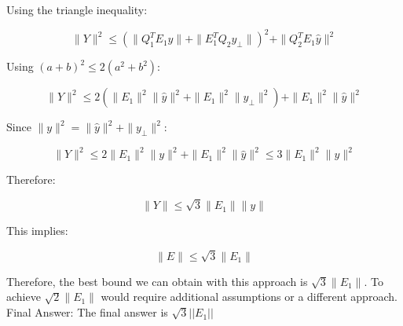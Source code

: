 Using the triangle inequality:

$$
\|Y\|^2 \le (\|Q_1^T E_1 \hat{y}\| + \|E_1^T Q_2 y_\perp\|)^2 + \|Q_2^T E_1 \hat{y}\|^2
$$

Using $(a+b)^2 \le 2(a^2 + b^2)$:

$$
\|Y\|^2 \le 2(\|E_1\|^2 \|\hat{y}\|^2 + \|E_1\|^2 \|y_\perp\|^2) + \|E_1\|^2 \|\hat{y}\|^2
$$

Since $\|y\|^2 = \|\hat{y}\|^2 + \|y_\perp\|^2$:

$$
\|Y\|^2 \le 2\|E_1\|^2 \|y\|^2 + \|E_1\|^2 \|\hat{y}\|^2 \le 3\|E_1\|^2 \|y\|^2
$$

Therefore:

$$
\|Y\| \le \sqrt{3} \|E_1\| \|y\|
$$

This implies:

$$
\|E\| \le \sqrt{3} \|E_1\|
$$

Therefore, the best bound we can obtain with this approach is $\sqrt{3}\|E_1\|$.  To achieve $\sqrt{2}\|E_1\|$ would require additional assumptions or a different approach.
Final Answer: The final answer is $\boxed{\sqrt{3}||E_1||}$

 